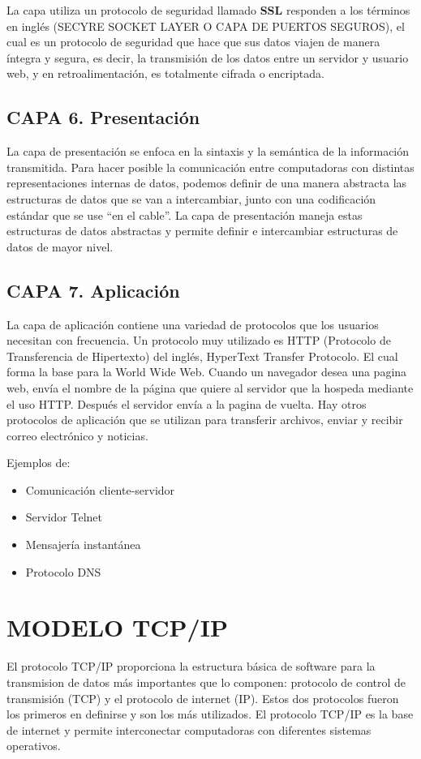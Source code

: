 \documentclass[letterpaper,12pt]{article}
\begin{document}
\begin{sloppypar}
La capa utiliza un protocolo de seguridad llamado \textbf{SSL} responden a los términos en inglés (SECYRE SOCKET LAYER O CAPA DE PUERTOS SEGUROS), el cual es un protocolo de seguridad que hace que sus datos viajen de manera íntegra y segura, es decir, la transmisión de los datos entre un servidor y usuario web, y en retroalimentación, es totalmente cifrada o encriptada.

\subsection{CAPA 6. Presentación}
La capa de presentación se enfoca en la sintaxis y la semántica de la información transmitida. Para hacer posible la comunicación entre computadoras con distintas representaciones internas de datos, podemos definir de una manera abstracta las estructuras de datos que se van a intercambiar, junto con una codificación estándar que se use “en el cable”. La capa de presentación maneja estas estructuras de datos abstractas y permite definir e intercambiar estructuras de datos de mayor nivel.

\subsection{CAPA 7. Aplicación}
La capa de aplicación contiene una variedad de protocolos que los usuarios necesitan con frecuencia. Un protocolo muy utilizado es HTTP (Protocolo de Transferencia de Hipertexto) del inglés, HyperText Transfer Protocolo. El cual forma la base para la World Wide Web. Cuando un navegador desea una pagina web, envía el nombre de la página que quiere al servidor que la hospeda mediante el uso HTTP. Después el servidor envía a la pagina de vuelta. Hay otros protocolos de aplicación que se utilizan para transferir archivos, enviar y recibir correo electrónico y noticias.

Ejemplos de: 
\begin{itemize}
    \item Comunicación cliente-servidor
    \item Servidor Telnet 
    \item Mensajería instantánea
    \item Protocolo DNS
\end{itemize}
\newpage
\section{MODELO TCP/IP}
El protocolo TCP/IP proporciona la estructura básica de software para la transmision de datos más importantes que lo componen: protocolo de control de transmisión (TCP) y el protocolo de internet (IP). Estos dos protocolos fueron los primeros en definirse y son los más utilizados. El protocolo TCP/IP es la base de internet y permite interconectar computadoras con diferentes sistemas operativos.


\end{sloppypar}
\end{document}
